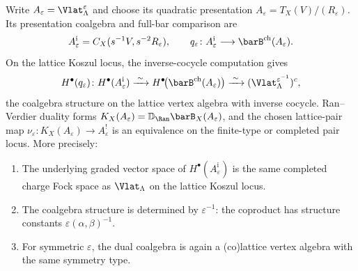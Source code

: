 \begin{theorem}
\label{thm:lattice:koszul-dual}
Write $A_\varepsilon=\Vlat_\Lambda^\varepsilon$ and choose its
quadratic presentation
$A_\varepsilon=T_X(V)/(R_\varepsilon)$.  Its presentation coalgebra
and full-bar comparison are
\[
A_\varepsilon^{\mathrm i}=C_X(s^{-1}V,s^{-2}R_\varepsilon),
\qquad
q_\varepsilon\colon A_\varepsilon^{\mathrm i}
\longrightarrow\barB^{\mathrm{ch}}(A_\varepsilon).
\]
On the lattice Koszul locus, the inverse-cocycle computation gives
\begin{equation}\label{eq:lattice:koszul-dual}
H^\bullet(q_\varepsilon)\colon
H^\bullet(A_\varepsilon^{\mathrm i})
\xrightarrow{\;\sim\;}
H^\bullet\!\bigl(\barB^{\mathrm{ch}}(A_\varepsilon)\bigr)
\xrightarrow{\;\sim\;}
(\Vlat_\Lambda^{\varepsilon^{-1}})^c,
\end{equation}
the coalgebra structure on the lattice vertex algebra with inverse
cocycle.  Ran--Verdier duality forms
$K_X(A_\varepsilon)=\mathbb D_{\Ran}
\barB_X(A_\varepsilon)$, and the chosen lattice-pair map
$\nu_\varepsilon\colon K_X(A_\varepsilon)\to A_\varepsilon^!$
is an equivalence on the finite-type or completed pair locus. More
precisely:
\begin{enumerate}[label=(\roman*)]
\item The underlying graded vector space of
 $H^\bullet(A_\varepsilon^{\mathrm i})$ is the same completed charge
 Fock space as $\Vlat_\Lambda$ on the lattice Koszul locus.
\item The coalgebra structure is determined by $\varepsilon^{-1}$:
 the coproduct has structure constants
 $\varepsilon(\alpha,\beta)^{-1}$.
\item For symmetric $\varepsilon$, the dual coalgebra is again a
 (co)lattice vertex algebra with the same symmetry type.
\end{enumerate}
\end{theorem}

